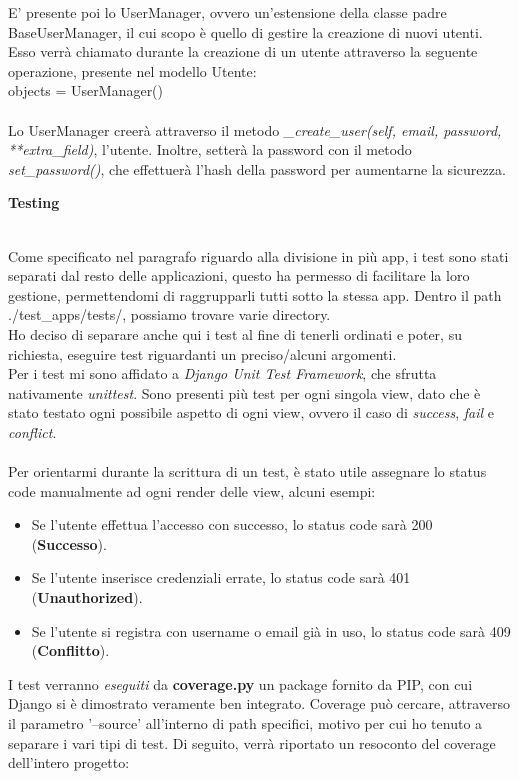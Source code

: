 \documentclass[12pt]{article}
\begin{document}
	\noindent E' presente poi lo UserManager, ovvero un'estensione della classe padre BaseUserManager, il cui scopo è quello di gestire la creazione di nuovi utenti. Esso verrà chiamato durante la creazione di un utente attraverso la seguente operazione, presente nel modello Utente:\\ \noindent objects = UserManager() \\ \\
	Lo UserManager creerà attraverso il metodo \textit{\_create\_user(self, email, password, **extra\_field)}, l'utente. Inoltre, setterà la password con il metodo \textit{set\_password()}, che effettuerà l'hash della password per aumentarne la sicurezza.

	\pagebreak
	
	
	\noindent \centerline {\Huge \textbf{Testing}} \\
	
	\noindent Come specificato nel paragrafo riguardo alla divisione in più app, i test sono stati separati dal resto delle applicazioni, questo ha permesso di facilitare la loro gestione, permettendomi di raggrupparli tutti sotto la stessa app. Dentro il path ./test\_apps/tests/, possiamo trovare varie directory. \\Ho deciso di separare anche qui i test al fine di tenerli ordinati e poter, su richiesta, eseguire test riguardanti un preciso/alcuni argomenti. \\
	Per i test mi sono affidato a \textit{Django Unit Test Framework}, che sfrutta nativamente \textit{unittest}.
	Sono presenti più test per ogni singola view, dato che è stato testato ogni possibile aspetto di ogni view, ovvero il caso di \textit{success}, \textit{fail} e \textit{conflict}. \\ \\
	Per orientarmi durante la scrittura di un test, è stato utile assegnare lo status code manualmente ad ogni render delle view, alcuni esempi:
	\begin{itemize}
		\item Se l'utente effettua l'accesso con successo, lo status code sarà 200 (\textbf{Successo}).
		\item Se l'utente inserisce credenziali errate, lo status code sarà 401 (\textbf{Unauthorized}).
		\item Se l'utente si registra con username o email già in uso, lo status code sarà 409 (\textbf{Conflitto}).
	\end{itemize}

	\noindent I test verranno \textit{eseguiti} da \textbf{coverage.py} un package fornito da PIP, con cui Django si è dimostrato veramente ben integrato. Coverage può cercare, attraverso il parametro '--source' all'interno di path specifici, motivo per cui ho tenuto a separare i vari tipi di test. Di seguito, verrà riportato un resoconto del coverage dell'intero progetto:
	
\end{document}
